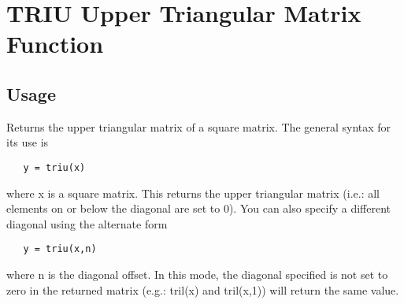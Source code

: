 \section{TRIU Upper Triangular Matrix Function}

\subsection{Usage}

 
 Returns the upper triangular matrix of a square matrix. The general
 syntax for its use is
\begin{verbatim}
   y = triu(x)
\end{verbatim}
 where x is a square matrix. This returns the upper triangular matrix
 (i.e.: all elements on or below the diagonal are set to 0). You can also
 specify a different diagonal using the alternate form
\begin{verbatim}
   y = triu(x,n)
\end{verbatim}
 where n is the diagonal offset. In this mode, the diagonal specified 
 is not set to zero in the returned matrix (e.g.: tril(x) and tril(x,1))
 will return the same value.
